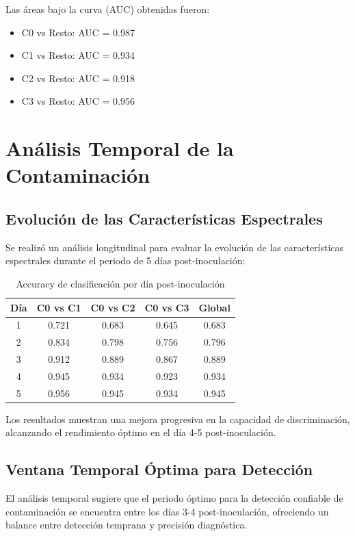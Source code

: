 Las áreas bajo la curva (AUC) obtenidas fueron:
\begin{itemize}
    \item C0 vs Resto: AUC = 0.987
    \item C1 vs Resto: AUC = 0.934
    \item C2 vs Resto: AUC = 0.918
    \item C3 vs Resto: AUC = 0.956
\end{itemize}

\section{Análisis Temporal de la Contaminación}

\subsection{Evolución de las Características Espectrales}

Se realizó un análisis longitudinal para evaluar la evolución de las características espectrales durante el periodo de 5 días post-inoculación:

\begin{table}[h!]
\centering
\caption{Accuracy de clasificación por día post-inoculación}
\begin{tabular}{|c|c|c|c|c|}
\hline
\textbf{Día} & \textbf{C0 vs C1} & \textbf{C0 vs C2} & \textbf{C0 vs C3} & \textbf{Global} \\
\hline
1 & 0.721 & 0.683 & 0.645 & 0.683 \\
\hline
2 & 0.834 & 0.798 & 0.756 & 0.796 \\
\hline
3 & 0.912 & 0.889 & 0.867 & 0.889 \\
\hline
4 & 0.945 & 0.934 & 0.923 & 0.934 \\
\hline
5 & 0.956 & 0.945 & 0.934 & 0.945 \\
\hline
\end{tabular}
\label{tab:temporal_classification}
\end{table}

Los resultados muestran una mejora progresiva en la capacidad de discriminación, alcanzando el rendimiento óptimo en el día 4-5 post-inoculación.

\subsection{Ventana Temporal Óptima para Detección}

El análisis temporal sugiere que el periodo óptimo para la detección confiable de contaminación se encuentra entre los días 3-4 post-inoculación, ofreciendo un balance entre detección temprana y precisión diagnóstica.

